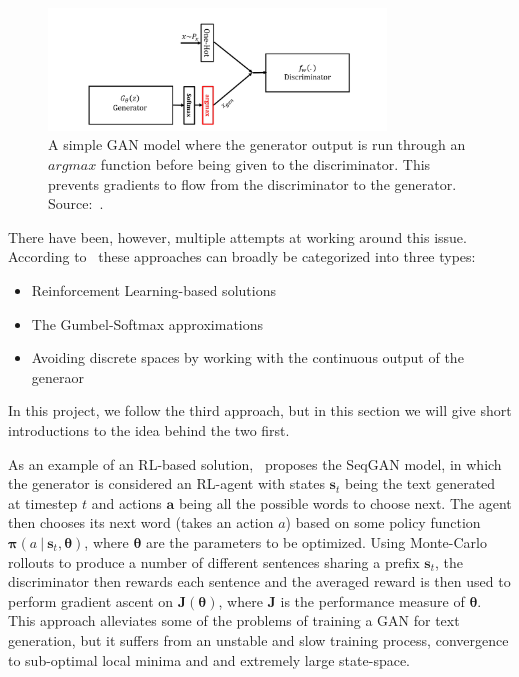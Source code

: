 \documentclass{article}
\newcommand\given[1][]{\:#1\vert\:}
\begin{document}
\begin{figure}[h]
    \centering
    \captionsetup{width=0.8\textwidth}
    \includegraphics[width=0.8\textwidth]{argmaxGAN.png}
    \caption{%
        A simple GAN model where the generator output is run through an
        $argmax$ function before being given to the discriminator. This prevents
        gradients to flow from the discriminator to the generator.
        Source:~\cite{haidar2019textkdgan}.
    }\label{fig:argmaxGAN}
\end{figure}

There have been, however, multiple attempts at working around this issue.
According to~\cite{Chintapalli2019} these approaches can broadly be categorized
into three types:

\begin{itemize}
    \item Reinforcement Learning-based solutions
    \item The Gumbel-Softmax approximations
    \item Avoiding discrete spaces by working with the continuous output of the
        generaor
\end{itemize}

In this project, we follow the third approach, but in this section we will give
short introductions to the idea behind the two first.

As an example of an RL-based solution,~\cite{yu2016seqgan} proposes the SeqGAN
model, in which the generator is considered an RL-agent with states
$\mathbf{s}_t$ being the text generated at timestep $t$ and actions $\mathbf{a}$
being all the possible words to choose next. The agent then chooses its next
word (takes an action $a$) based on some policy function $\bm{\pi}(a \given
\bm{s}_t, \bm{\theta})$, where $\bm{\theta}$ are the parameters to be
optimized. Using Monte-Carlo rollouts to produce a number of different
sentences sharing a prefix $\bm{s}_t$, the discriminator then rewards each
sentence and the averaged reward is then used to perform gradient ascent on
$\bm{J}(\bm{\theta})$, where $\bm{J}$ is the performance measure of
$\bm{\theta}$. This approach alleviates some of the problems of training a GAN
for text generation, but it suffers from an unstable and slow training process,
convergence to sub-optimal local minima and and extremely large state-space.\
\end{document}
